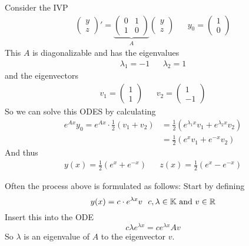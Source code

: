 \documentclass[../../script.tex]{subfiles}
\begin{document}
\begin{eg}
    Consider the IVP 
    \begin{align*}
        \begin{pmatrix}
            y \\ z
        \end{pmatrix}'
        = \underbrace{\begin{pmatrix}
            0 & 1 \\ 1 & 0
        \end{pmatrix}}_A
        \begin{pmatrix}
            y \\ z
        \end{pmatrix}
        && y_0 = \begin{pmatrix}
            1 \\ 0
        \end{pmatrix}
    \end{align*}
    This $A$ is diagonalizable and has the eigenvalues 
    \begin{align*}
        \lambda_1 = -1 && \lambda_2 = 1
    \end{align*}
    and the eigenvectors 
    \begin{align*}
        v_1 = \begin{pmatrix}
            1 \\ 1
        \end{pmatrix}
        &&
        v_2 = \begin{pmatrix}
            1 \\ -1
        \end{pmatrix}
    \end{align*}
    So we can solve this ODES by calculating 
    \begin{align*}
        e^{Ax} y_0 = e^{Ax} \cdot \frac{1}{2}(v_1 + v_2) &= \frac{1}{2}\left(e^{\lambda_1 x} v_1 + e^{\lambda_2 x} v_2\right) \\
        &= \frac{1}{2} \left(e^x v_1 + e^{-x} v_2\right)
    \end{align*}
    And thus 
    \begin{align*}
        y(x) = \frac{1}{2} \left(e^x + e^{-x}\right) && z(x) = \frac{1}{2} \left(e^x - e^{-x}\right)
    \end{align*}
\end{eg}

\begin{rem}
    Often the process above is formulated as follows:
    Start by defining 
    \[
        y(x) = c \cdot e^{\lambda x} v ~~c, \lambda \in \mathbb{K} \text{ and } v \in \mathbb{R}
    \]
    Insert this into the ODE
    \[
        c\lambda e^{\lambda x} = c e^{\lambda x} Av
    \]
    So $\lambda$ is an eigenvalue of $A$ to the eigenvector $v$.
\end{rem}
\end{document}
